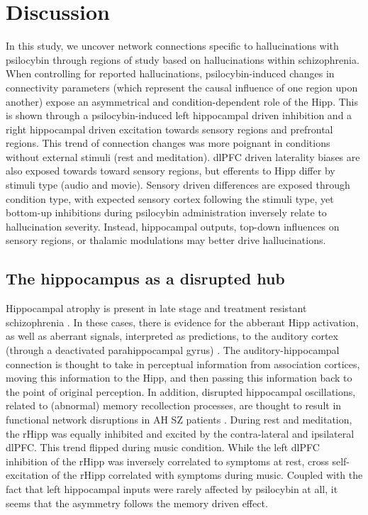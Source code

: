\documentclass{article}
\begin{document}
\section{Discussion}

In this study, we uncover network connections specific to hallucinations with psilocybin through regions of study based on hallucinations within schizophrenia. When controlling for reported hallucinations, psilocybin-induced changes in connectivity parameters (which represent the causal influence of one region upon another) expose an asymmetrical and condition-dependent role of the Hipp. This is shown through a psilocybin-induced left hippocampal driven inhibition and a right hippocampal driven excitation towards sensory regions and prefrontal regions. This trend of connection changes was more poignant in conditions without external stimuli (rest and meditation). dlPFC driven laterality biases are also exposed towards toward sensory regions, but efferents to Hipp differ by stimuli type (audio and movie). Sensory driven differences are exposed through condition type, with expected sensory cortex following the stimuli type, yet bottom-up inhibitions during psilocybin administration inversely relate to hallucination severity. Instead, hippocampal outputs, top-down influences on sensory regions, or thalamic modulations may better drive hallucinations. 

\subsection{The hippocampus as a disrupted hub}
Hippocampal atrophy is present in late stage and treatment resistant schizophrenia \citep{maller2012hippocampal}. In these cases, there is evidence for the abberant Hipp activation, as well as aberrant signals, interpreted as predictions, to the auditory cortex (through a deactivated parahippocampal gyrus) \citep{diederen_deactivation_2010, hoffman_time_2008, jardri_cortical_2011}. The auditory-hippocampal connection is thought to take in perceptual information from association cortices, moving this information to the Hipp, and then passing this information back to the point of original perception. In addition, disrupted hippocampal oscillations, related to (abnormal) memory recollection processes, are thought to result in functional network disruptions in AH SZ patients \citep{hare_disrupted_2018}. During rest and meditation, the rHipp was equally inhibited and excited by the contra-lateral and ipsilateral dlPFC. This trend flipped during music condition. While the left dlPFC inhibition of the rHipp was inversely correlated to symptoms at rest, cross self-excitation of the rHipp correlated with symptoms during music. Coupled with the fact that left hippocampal inputs were rarely affected by psilocybin at all, it seems that the asymmetry follows the memory driven effect. 
\end{document}
